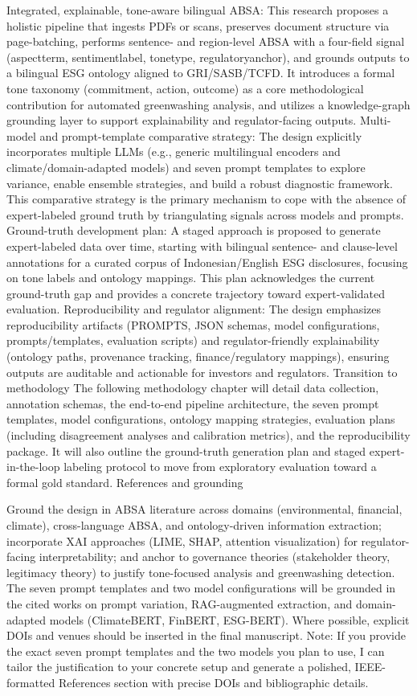 Integrated, explainable, tone-aware bilingual ABSA: This research proposes a holistic pipeline that ingests PDFs or scans, preserves document structure via page-batching, performs sentence- and region-level ABSA with a four-field signal (aspectterm, sentimentlabel, tonetype, regulatoryanchor), and grounds outputs to a bilingual ESG ontology aligned to GRI/SASB/TCFD. It introduces a formal tone taxonomy (commitment, action, outcome) as a core methodological contribution for automated greenwashing analysis, and utilizes a knowledge-graph grounding layer to support explainability and regulator-facing outputs.
Multi-model and prompt-template comparative strategy: The design explicitly incorporates multiple LLMs (e.g., generic multilingual encoders and climate/domain-adapted models) and seven prompt templates to explore variance, enable ensemble strategies, and build a robust diagnostic framework. This comparative strategy is the primary mechanism to cope with the absence of expert-labeled ground truth by triangulating signals across models and prompts.
Ground-truth development plan: A staged approach is proposed to generate expert-labeled data over time, starting with bilingual sentence- and clause-level annotations for a curated corpus of Indonesian/English ESG disclosures, focusing on tone labels and ontology mappings. This plan acknowledges the current ground-truth gap and provides a concrete trajectory toward expert-validated evaluation.
Reproducibility and regulator alignment: The design emphasizes reproducibility artifacts (PROMPTS, JSON schemas, model configurations, prompts/templates, evaluation scripts) and regulator-friendly explainability (ontology paths, provenance tracking, finance/regulatory mappings), ensuring outputs are auditable and actionable for investors and regulators.
Transition to methodology
The following methodology chapter will detail data collection, annotation schemas, the end-to-end pipeline architecture, the seven prompt templates, model configurations, ontology mapping strategies, evaluation plans (including disagreement analyses and calibration metrics), and the reproducibility package. It will also outline the ground-truth generation plan and staged expert-in-the-loop labeling protocol to move from exploratory evaluation toward a formal gold standard.
References and grounding

Ground the design in ABSA literature across domains (environmental, financial, climate), cross-language ABSA, and ontology-driven information extraction; incorporate XAI approaches (LIME, SHAP, attention visualization) for regulator-facing interpretability; and anchor to governance theories (stakeholder theory, legitimacy theory) to justify tone-focused analysis and greenwashing detection. The seven prompt templates and two model configurations will be grounded in the cited works on prompt variation, RAG-augmented extraction, and domain-adapted models (ClimateBERT, FinBERT, ESG-BERT). Where possible, explicit DOIs and venues should be inserted in the final manuscript.
Note: If you provide the exact seven prompt templates and the two models you plan to use, I can tailor the justification to your concrete setup and generate a polished, IEEE-formatted References section with precise DOIs and bibliographic details.